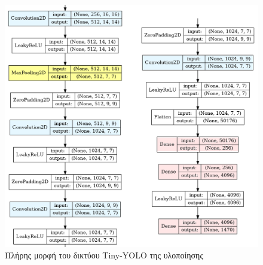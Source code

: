 \begin{figure}[H]
  \centering
  \includegraphics[width=1\textwidth]{./images/chapter5/yolotiny_parts_3_4.png}
  \caption[Πλήρης μορφή του δικτύου Tiny-YOLO της υλοποίησης]{Πλήρης μορφή του δικτύου Tiny-YOLO της υλοποίησης}
  \label{fig:yolotiny_graph}
\end{figure}


